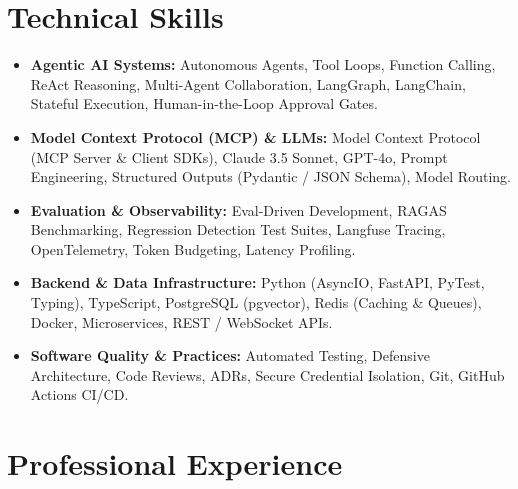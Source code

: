 \documentclass[a4paper,10pt]{article}
\begin{document}
\section{Technical Skills}
\begin{itemize}[leftmargin=1.2em, itemsep=2pt]
  \item \textbf{Agentic AI Systems:} Autonomous Agents, Tool Loops, Function Calling, ReAct Reasoning, Multi-Agent Collaboration, LangGraph, LangChain, Stateful Execution, Human-in-the-Loop Approval Gates.
  \item \textbf{Model Context Protocol (MCP) \& LLMs:} Model Context Protocol (MCP Server \& Client SDKs), Claude 3.5 Sonnet, GPT-4o, Prompt Engineering, Structured Outputs (Pydantic / JSON Schema), Model Routing.
  \item \textbf{Evaluation \& Observability:} Eval-Driven Development, RAGAS Benchmarking, Regression Detection Test Suites, Langfuse Tracing, OpenTelemetry, Token Budgeting, Latency Profiling.
  \item \textbf{Backend \& Data Infrastructure:} Python (AsyncIO, FastAPI, PyTest, Typing), TypeScript, PostgreSQL (pgvector), Redis (Caching \& Queues), Docker, Microservices, REST / WebSocket APIs.
  \item \textbf{Software Quality \& Practices:} Automated Testing, Defensive Architecture, Code Reviews, ADRs, Secure Credential Isolation, Git, GitHub Actions CI/CD.
\end{itemize}

\section{Professional Experience}
\end{document}
